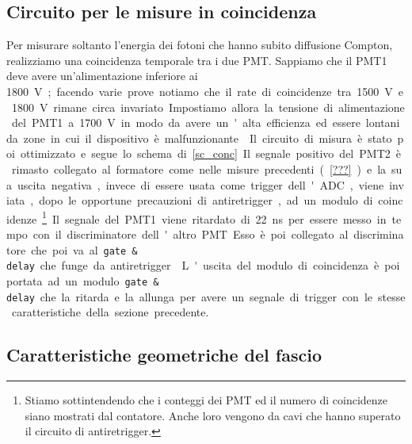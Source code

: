 \subsection{Circuito per le misure in coincidenza}

Per misurare soltanto l'energia dei fotoni che hanno subito diffusione Compton, realizziamo una coincidenza temporale tra i due PMT. Sappiamo che il PMT1 deve avere un'alimentazione inferiore ai \SI{1800}V; facendo varie prove notiamo che il rate di coincidenze tra \SI{1500}V e \SI{1800}V rimane circa invariato. Impostiamo allora la tensione di alimentazione del PMT1 a \SI{1700}V in modo da avere un'alta efficienza ed essere lontani da zone in cui il dispositivo è malfunzionante.

Il circuito di misura è stato poi ottimizzato e segue lo schema di \autoref{sc_conc}. Il segnale positivo del PMT2 è rimasto collegato al formatore come nelle misure precedenti (\autoref{???}) e la sua uscita negativa, invece di essere usata come trigger dell'ADC, viene inviata, dopo le opportune precauzioni di antiretrigger, ad un modulo di coincidenze%
\footnote{Stiamo sottintendendo che i conteggi dei PMT ed il numero di coincidenze siano mostrati dal contatore. Anche loro vengono da cavi che hanno superato il circuito di antiretrigger.}.

Il segnale del PMT1  viene ritardato di \SI{22}{ns} per essere messo in tempo con il discriminatore dell'altro PMT. Esso è poi collegato al discriminatore che poi va al \texttt{gate \& delay} che funge da antiretrigger.

L'uscita del modulo di coincidenza è poi portata ad un modulo \texttt{gate \& delay} che la ritarda e la allunga per avere un segnale di trigger con le stesse caratteristiche della sezione precedente.


\subsection{Caratteristiche geometriche del fascio}

